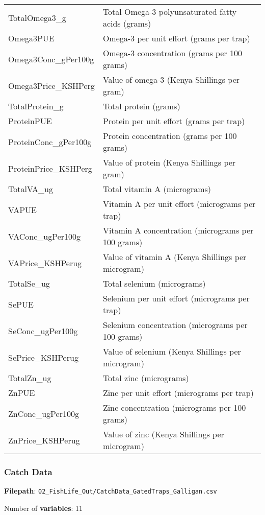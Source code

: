 \documentclass[
]{article}
\begin{document}
\begin{longtable}[]{@{}
  >{\raggedright\arraybackslash}p{}
  >{\raggedright\arraybackslash}p{}@{}}
TotalOmega3\_g & Total Omega-3 polyunsaturated fatty acids (grams) \\
Omega3PUE & Omega-3 per unit effort (grams per trap) \\
Omega3Conc\_gPer100g & Omega-3 concentration (grams per 100 grams) \\
Omega3Price\_KSHPerg & Value of omega-3 (Kenya Shillings per gram) \\
TotalProtein\_g & Total protein (grams) \\
ProteinPUE & Protein per unit effort (grams per trap) \\
ProteinConc\_gPer100g & Protein concentration (grams per 100 grams) \\
ProteinPrice\_KSHPerg & Value of protein (Kenya Shillings per gram) \\
TotalVA\_ug & Total vitamin A (micrograms) \\
VAPUE & Vitamin A per unit effort (micrograms per trap) \\
VAConc\_ugPer100g & Vitamin A concentration (micrograms per 100
grams) \\
VAPrice\_KSHPerug & Value of vitamin A (Kenya Shillings per
microgram) \\
TotalSe\_ug & Total selenium (micrograms) \\
SePUE & Selenium per unit effort (micrograms per trap) \\
SeConc\_ugPer100g & Selenium concentration (micrograms per 100 grams) \\
SePrice\_KSHPerug & Value of selenium (Kenya Shillings per microgram) \\
TotalZn\_ug & Total zinc (micrograms) \\
ZnPUE & Zinc per unit effort (micrograms per trap) \\
ZnConc\_ugPer100g & Zinc concentration (micrograms per 100 grams) \\
ZnPrice\_KSHPerug & Value of zinc (Kenya Shillings per microgram) \\
\bottomrule
\end{longtable}

\hypertarget{catch-data}{%
\subsubsection{Catch Data}\label{catch-data}}

\textbf{Filepath}:
\texttt{02\_FishLife\_Out/CatchData\_GatedTraps\_Galligan.csv}

Number of \textbf{variables}: 11
\end{document}
